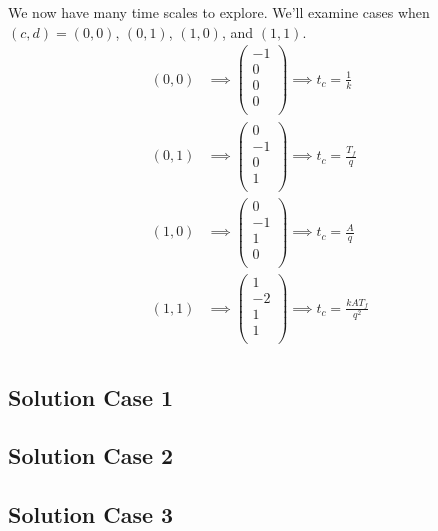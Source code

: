 \documentclass[12pt]{article}
\begin{document}
\begin{enumerate}
  We now have many time scales to explore. We'll examine cases when
  $(c,d)=(0,0)$, $(0,1)$, $(1,0)$, and $(1,1)$.
  \begin{equation}
    \begin{aligned}
      (0,0) &\implies
      \begin{pmatrix}
        -1 \\ 0 \\ 0 \\ 0 \\
      \end{pmatrix} \implies t_c =\frac{1}{k} \\
      (0,1) &\implies
      \begin{pmatrix}
        0 \\ -1 \\ 0 \\ 1 \\
      \end{pmatrix} \implies t_c =\frac{T_f}{q} \\
      (1,0) &\implies
      \begin{pmatrix}
        0 \\ -1 \\ 1 \\ 0 \\
      \end{pmatrix} \implies t_c =\frac{A}{q} \\
      (1,1) &\implies
      \begin{pmatrix}
        1 \\ -2 \\ 1 \\ 1 \\
      \end{pmatrix} \implies t_c =\frac{kAT_f}{q^2} \\
    \end{aligned}
  \end{equation}
\end{enumerate}
\subsection*{Solution Case 1}
\todo
\subsection*{Solution Case 2}
\todo
\subsection*{Solution Case 3}
\todo
\end{document}
